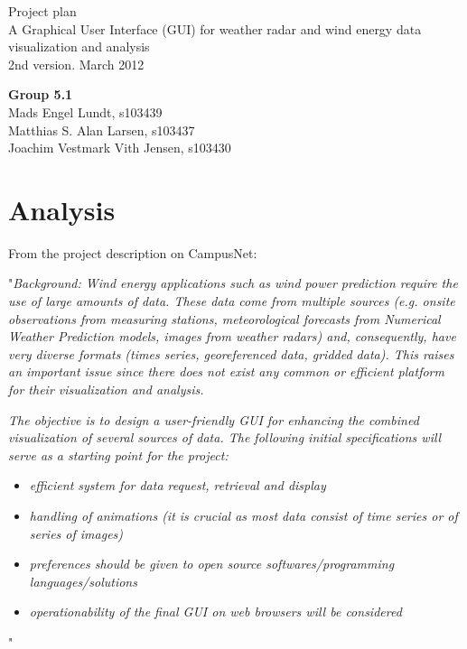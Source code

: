 \documentclass[10pt,a4paper]{article}
\begin{document}
\begin{center}
\Huge{Project plan}\\[.2cm]
\Large{A Graphical User Interface (GUI) for weather radar and wind energy data visualization and analysis}\\[.2cm]
2nd version. March 2012
\end{center}
\textbf{Group 5.1}\\
Mads Engel Lundt, s103439\\
Matthias S. Alan Larsen, s103437\\
Joachim Vestmark Vith Jensen, s103430\\

\section{Analysis}
From the project description on CampusNet:

"\emph{Background: Wind energy applications such as wind power prediction require the use of large amounts of data. These data come from multiple sources (e.g. onsite observations from measuring stations, meteorological forecasts from Numerical Weather Prediction models, images from weather radars) and, consequently, have very diverse formats (times series, georeferenced data, gridded data). This raises an important issue since there does not exist any common or efficient platform for their visualization and analysis.}

\emph{The objective is to design a user-friendly GUI for enhancing the combined visualization of several sources of data. The following initial specifications will serve as a starting point for the project: }
\begin{itemize}
\item \emph{efficient system for data request, retrieval and display}
\item \emph{handling of animations (it is crucial as most data consist of  time series or of series of images)}
\item \emph{preferences should be given to open source softwares/programming languages/solutions}
\item \emph{operationability of the final GUI on web browsers will be considered}
\end{itemize} 
"

\newpage
\end{document}
